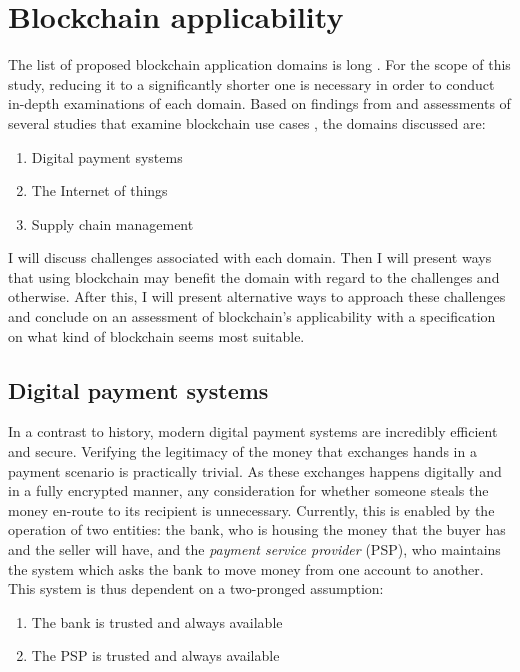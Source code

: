 \section{Blockchain applicability} \label{applications}

The list of proposed blockchain application domains is long
\cite{zileUseCases}. For the scope of this study, reducing it to a
significantly shorter one is necessary in order to conduct in-depth
examinations of each domain. Based on findings from \cite{jaoudeApplications} 
and assessments of several studies that examine blockchain use cases
\cite{sankaScalability,wustBlockchainNeed,zhengChallenges}, the
domains discussed are:

\begin{enumerate}
  \item Digital payment systems
  \item The Internet of things
  \item Supply chain management
\end{enumerate}

I will discuss challenges associated with each domain. Then I will present
ways that using blockchain may benefit the domain with regard to the
challenges and otherwise. After this, I will present alternative ways
to approach these challenges and conclude on an assessment of blockchain's
applicability with a specification on what kind of blockchain seems most
suitable.

\subsection{Digital payment systems}

In a contrast to history, modern digital payment systems are
incredibly efficient and secure. Verifying the legitimacy of the money
that exchanges hands in a payment scenario is practically trivial. As
these exchanges happens digitally and in a fully encrypted manner, any
consideration for whether someone steals the money en-route to its
recipient is unnecessary. Currently, this is enabled by the operation
of two entities: the bank, who is housing the money that the buyer has
and the seller will have, and the \textit{payment service provider}
(PSP), who maintains the system which asks the bank to move money from
one account to another. This system is thus dependent on a two-pronged
assumption:
\begin{enumerate}
  \item The bank is trusted and always available
  \item The PSP is trusted and always available
\end{enumerate}

